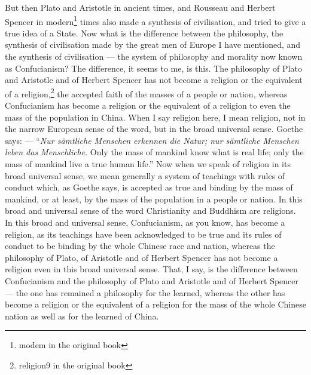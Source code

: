 But then Plato and Aristotle in ancient times, and Rousseau and Herbert Spencer in modern\footnote{modem in the original book} times also made a synthesis of civilisation, and tried to give a true idea of a State.
Now what is the difference between the philosophy, the synthesis of civilisation made by the great men of Europe I have mentioned, and the synthesis of civilisation --- the system of philosophy and morality now known as Confucianism?
The difference, it seems to me, is this.
The philosophy of Plato and Aristotle and of Herbert Spencer has not become a religion or the equivalent of a religion,\footnote{religion9 in the original book} the accepted faith of the masses of a people or nation, whereas Confucianism has become a religion or the equivalent of a religion to even the mass of the population in China.
When I say religion here, I mean religion, not in the narrow European sense of the word, but in the broad universal sense.
Goethe says: --- ``\emph{Nur s\"amtliche Menschen erkennen die Natur; nur s\"amtliche Menschen leben das Menschliche}. Only the mass of mankind know what is real life; only the mass of mankind live a true human life.''\cite{num13}
Now when we speak of religion in its broad universal sense, we mean generally a system of teachings with rules of conduct which, as Goethe says, is accepted as true and binding by the mass of mankind, or at least, by the mass of the population in a people or nation.
In this broad and universal sense of the word Christianity and Buddhism are religions.
In this broad and universal sense, Confucianism, as you know, has become a religion, as its teachings have been acknowledged to be true and its rules of conduct to be binding by the whole Chinese race and nation, whereas the philosophy of Plato, of Aristotle and of Herbert Spencer has not become a religion even in this broad universal sense.
That, I say, is the difference between Confucianism and the philosophy of Plato and Aristotle and of Herbert Spencer --- the one has remained a philosophy for the learned, whereas the other has become a religion or the equivalent of a religion for the mass of the whole Chinese nation as well as for the learned of China.

